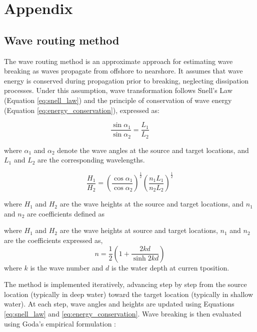 

\chapter{Appendix}
\label{Appendix}

\section{Wave routing method}
\label{Wave routing method}

The wave routing method is an approximate approach for estimating wave breaking
as waves propagate from offshore to nearshore. It assumes that wave energy is
conserved during propagation prior to breaking, neglecting dissipation
processes. Under this assumption, wave transformation follows Snell’s Law
(Equation \ref{eq:snell_law}) and the principle of conservation of wave energy
(Equation \ref{eq:energy_conservation}), expressed as:

\begin{equation}
  \frac{\sin \alpha_1}{\sin \alpha_2} = \frac{L_1}{L_2}
\label{eq:snell_law}
\end{equation}

where $\alpha_1$ and $\alpha_2$ denote the wave angles at the source and target
locations, and $L_1$ and $L_2$ are the corresponding wavelengths.

\begin{equation}
  \frac{H_1}{H_2} = (\frac{\cos \alpha_1}{\cos \alpha_2})^{\frac{1}{2}}
  (\frac{n_1L_1}{n_2L_2})^{\frac{1}{2}}
\label{eq:energy_conservation}
\end{equation}

where $H_1$ and $H_2$ are the wave heights at the source and target locations,
and $n_1$ and $n_2$ are coefficients defined as


where $H_1$ and $H_2$ are the wave heights at source and target locations, $n_1$
and $n_2$ are the coefficients expressed as,
\begin{equation}
  n = \frac{1}{2}(1+\frac{2kd}{\sinh 2kd})
\label{eq:coefficient}
\end{equation}
where $k$ is the wave number and $d$ is the water depth at curren tposition.

The method is implemented iteratively, advancing step by step from the source
location (typically in deep water) toward the target location (typically in
shallow water). At each step, wave angles and heights are updated using
Equations \ref{eq:snell_law} and \ref{eq:energy_conservation}. Wave breaking is
then evaluated using Goda’s empirical formulation \citep[Equation
\ref{eq:goda};][]{goda1970synthesis,rattanapitikon2000verification}:

